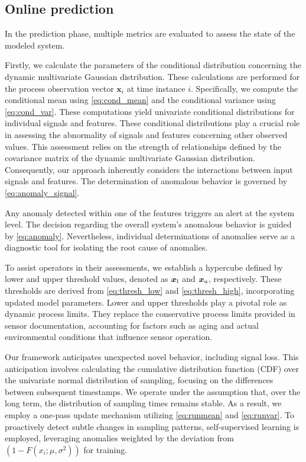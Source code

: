 \subsection{Online prediction}\label{predict}
In the prediction phase, multiple metrics are evaluated to assess the state of the modeled system.

Firstly, we calculate the parameters of the conditional distribution concerning the dynamic multivariate Gaussian distribution. These calculations are performed for the process observation vector $\boldsymbol{x}_i$ at time instance $i$. Specifically, we compute the conditional mean using \eqref{eq:cond_mean} and the conditional variance using \eqref{eq:cond_var}. These computations yield univariate conditional distributions for individual signals and features. These conditional distributions play a crucial role in assessing the abnormality of signals and features concerning other observed values. This assessment relies on the strength of relationships defined by the covariance matrix of the dynamic multivariate Gaussian distribution. Consequently, our approach inherently considers the interactions between input signals and features. The determination of anomalous behavior is governed by \eqref{eq:anomaly_signal}.

Any anomaly detected within one of the features triggers an alert at the system level. The decision regarding the overall system's anomalous behavior is guided by \eqref{eq:anomaly}. Nevertheless, individual determinations of anomalies serve as a diagnostic tool for isolating the root cause of anomalies.

To assist operators in their assessments, we establish a hypercube defined by lower and upper threshold values, denoted as $\boldsymbol{x} _{\text{l}}$ and $\boldsymbol{x} _{\text{u}}$, respectively. These thresholds are derived from \eqref{eq:thresh_low} and \eqref{eq:thresh_high}, incorporating updated model parameters. Lower and upper thresholds play a pivotal role as dynamic process limits. They replace the conservative process limits provided in sensor documentation, accounting for factors such as aging and actual environmental conditions that influence sensor operation.

Our framework anticipates unexpected novel behavior, including signal loss. This anticipation involves calculating the cumulative distribution function (CDF) over the univariate normal distribution of sampling, focusing on the differences between subsequent timestamps. We operate under the assumption that, over the long term, the distribution of sampling times remains stable. As a result, we employ a one-pass update mechanism utilizing \eqref{eq:runmean} and \eqref{eq:runvar}. To proactively detect subtle changes in sampling patterns, self-supervised learning is employed, leveraging anomalies weighted by the deviation from $(1 - F(x_i; \mu, \sigma^2))$ for training.

